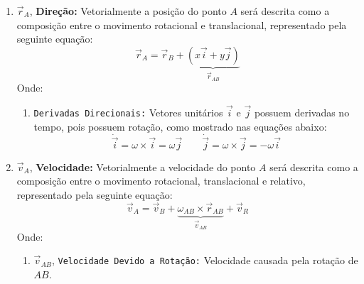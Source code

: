 \documentclass{article}
\begin{document}
                \begin{enumerate}[rightmargin = \leftmargin]
                    \item $\vec{r}_{A}$, \textbf{Direção:} Vetorialmente a posição do ponto $A$ será descrita como a composição entre o movimento rotacional e translacional, representado pela seguinte equação:
                        \begin{equation}
                            \boxed{
                                \vec{r}_{A} = 
                                \vec{r}_{B} + 
                                \underbrace{
                                    (x\vec{i} + y\vec{j})
                                }_{\vec{r}_{AB}}
                            }
                        \end{equation}
                    Onde:
                        \begin{enumerate}[rightmargin = \leftmargin]
                            \item \texttt{Derivadas Direcionais:} Vetores unitários $\vec{i}$ e $\vec{j}$ possuem derivadas no tempo, pois possuem rotação, como mostrado nas equações abaixo:
                                \begin{equation}
                                    \boxed{
                                        \dot{\vec{i}} = \omega\times\vec{i} = \omega\vec{j}
                                    }
                                    \qquad
                                    \boxed{
                                        \dot{\vec{j}} = \omega\times\vec{j} = -\omega\vec{i}
                                    }
                                \end{equation}\noindent
                        \end{enumerate}

                    \item $\vec{v}_{A}$, \textbf{Velocidade:} Vetorialmente a velocidade do ponto $A$ será descrita como a composição entre o movimento rotacional,  translacional e relativo, representado pela seguinte equação:
                        \begin{equation}
                            \boxed{
                                \vec{v}_{A} = 
                                \vec{v}_{B} + 
                                \underbrace{
                                    \omega_{AB}\times\vec{r}_{AB}
                                }_{\vec{v}_{AB}} + 
                                \vec{v}_{R}
                            }
                        \end{equation}
                    Onde:
                        \begin{enumerate}[rightmargin = \leftmargin, noitemsep]
                            \item $\vec{v}_{AB}$, \texttt{Velocidade Devido a Rotação:} Velocidade causada pela rotação de $AB$.


\end{enumerate}
\end{enumerate}
\end{document}
